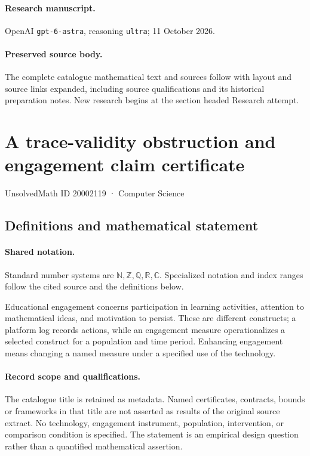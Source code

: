 \documentclass[11pt]{article}
\begin{document}
\paragraph{Research manuscript.} OpenAI \texttt{gpt-6-astra}, reasoning \texttt{ultra}; 11 October 2026.
\paragraph{Preserved source body.} The complete catalogue mathematical text and sources follow with layout and source links expanded, including source qualifications and its historical preparation notes. New research begins at the section headed Research attempt.

\section{A trace-validity obstruction and engagement claim certificate}\label{20002119}
{\small UnsolvedMath ID 20002119 · Computer Science}
\subsection{Definitions and mathematical statement}

\paragraph{Shared notation.}Standard number systems are $\mathbb N,\mathbb Z,\mathbb Q,\mathbb R,\mathbb C$. Specialized notation and index ranges follow the cited source and the definitions below.


Educational engagement concerns participation in learning activities, attention to mathematical ideas, and motivation to persist. These are different constructs; a platform log records actions, while an engagement measure operationalizes a selected construct for a population and time period. Enhancing engagement means changing a named measure under a specified use of the technology.
\paragraph{Record scope and qualifications.}
The catalogue title is retained as metadata. Named certificates, contracts, bounds or frameworks in that title are not asserted as results of the original source extract.
No technology, engagement instrument, population, intervention, or comparison condition is specified. The statement is an empirical design question rather than a quantified mathematical assertion.
\end{document}
